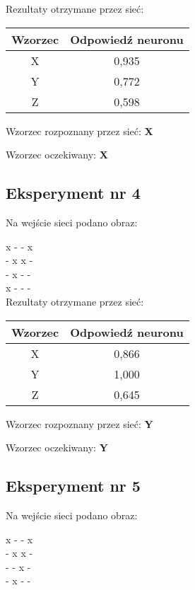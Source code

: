 \documentclass[12pt]{article}
\begin{document}
Rezultaty otrzymane przez sieć:

\begin{table}[h]
\begin{tabular}{|c|c|}
\hline 
Wzorzec & Odpowiedź neuronu \\ 
\hline 
X & 0,935 \\ \hline 
Y & 0,772 \\ \hline 
Z & 0,598 \\ \hline 
\end{tabular} 
\end{table}

Wzorzec rozpoznany przez sieć: \textbf{X}

Wzorzec oczekiwany: \textbf{X}

\subsection{Eksperyment nr 4}

Na wejście sieci podano obraz:

\noindent
x - - x \\
- x x - \\
- x - - \\
x - - - \\

Rezultaty otrzymane przez sieć:

\begin{table}[h]
\begin{tabular}{|c|c|}
\hline 
Wzorzec & Odpowiedź neuronu \\ 
\hline 
X & 0,866 \\ \hline 
Y & 1,000 \\ \hline 
Z & 0,645 \\ \hline 
\end{tabular} 
\end{table}

Wzorzec rozpoznany przez sieć: \textbf{Y}

Wzorzec oczekiwany: \textbf{Y}

\clearpage

\subsection{Eksperyment nr 5}

Na wejście sieci podano obraz:

\noindent
x - - x \\
- x x - \\
- - x - \\
- x - - \\
\end{document}
